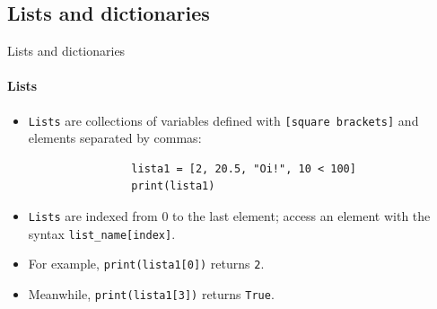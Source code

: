 \documentclass[notes,11pt, aspectratio=169, xcolor=table]{beamer}
\begin{document}
\subsection{Lists and dictionaries}  

    \begin{frame}[fragile=singleslide]{Lists and dictionaries}
    \framesubtitle{Lists}
    
         \begin{itemize}
            \item \texttt{Lists} are collections of variables defined with \texttt{[square brackets]} and elements separated by commas:

                \begin{verbatim}
                lista1 = [2, 20.5, "Oi!", 10 < 100] 
                print(lista1)
                \end{verbatim}    

            \item \texttt{Lists} are indexed from $0$ to the last element; access an element with the syntax \texttt{list_name[index]}.
            
            \item For example, \texttt{print(lista1[0])} returns \texttt{2}.
            
            \item Meanwhile, \texttt{print(lista1[3])} returns \texttt{True}.

        \end{itemize}       

    \end{frame}
\end{document}

